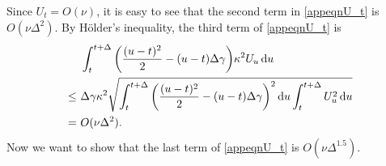 \documentclass{ws-ijfe}
\begin{document}
Since $U_t=O(\nu)$, it is easy to see that the second term in \eqref{appeqnU_t} is $O(\nu\Delta^2)$. By H\"older's inequality, the third term of \eqref{appeqnU_t} is
\begin{align*}
   &\,\, \int_{t}^{t+\Delta}\bigg(\frac{(u-t)^2}{2}-(u-t)\Delta\gamma \bigg)\kappa^2U_u\,\mathrm{d} u \\
   \leq&\,\, \Delta\gamma \kappa^2\sqrt{\int_{t}^{t+\Delta}\bigg(\frac{(u-t)^2}{2}-(u-t)\Delta\gamma \bigg)^2\,\mathrm{d} u\int_{t}^{t+\Delta}U_u^2\,\mathrm{d} u}\\
    = &\,\,O(\nu\Delta^2).
\end{align*}
Now we want to show that the last term of \eqref{appeqnU_t} is $O(\nu\Delta^{1.5})$.
\end{document}
